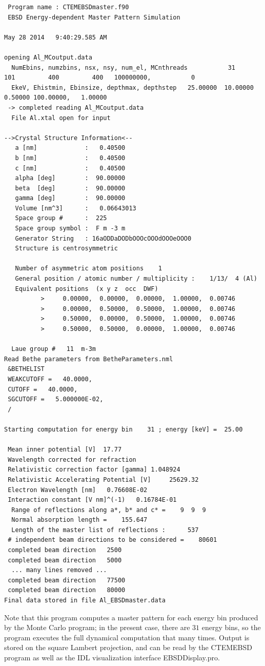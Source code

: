 \documentclass[DIV=calc, paper=letter, fontsize=11pt]{scrartcl}	 %
\begin{document}
\begin{verbatim}
 Program name : CTEMEBSDmaster.f90
 EBSD Energy-dependent Master Pattern Simulation

May 28 2014   9:40:29.585 AM

opening Al_MCoutput.data
  NumEbins, numzbins, nsx, nsy, num_el, MCnthreads           31         101         400         400   100000000,           0
  EkeV, Ehistmin, Ebinsize, depthmax, depthstep   25.00000  10.00000   0.50000 100.00000,   1.00000
 -> completed reading Al_MCoutput.data
  File Al.xtal open for input

-->Crystal Structure Information<--
   a [nm]             :   0.40500
   b [nm]             :   0.40500
   c [nm]             :   0.40500
   alpha [deg]        :  90.00000
   beta  [deg]        :  90.00000
   gamma [deg]        :  90.00000
   Volume [nm^3]      :   0.06643013
   Space group #      :  225
   Space group symbol :  F m -3 m
   Generator String   : 16aODDaDODbOOOcOOOdOOOeOOO0
   Structure is centrosymmetric

   Number of asymmetric atom positions    1
   General position / atomic number / multiplicity :    1/13/  4 (Al)
   Equivalent positions  (x y z  occ  DWF)
          >     0.00000,  0.00000,  0.00000,  1.00000,  0.00746
          >     0.00000,  0.50000,  0.50000,  1.00000,  0.00746
          >     0.50000,  0.00000,  0.50000,  1.00000,  0.00746
          >     0.50000,  0.50000,  0.00000,  1.00000,  0.00746

  Laue group #   11  m-3m
Read Bethe parameters from BetheParameters.nml
 &BETHELIST
 WEAKCUTOFF =   40.0000,
 CUTOFF =   40.0000,
 SGCUTOFF =   5.000000E-02,
 /

Starting computation for energy bin    31 ; energy [keV] =  25.00

 Mean inner potential [V]  17.77
 Wavelength corrected for refraction
 Relativistic correction factor [gamma] 1.048924
 Relativistic Accelerating Potential [V]     25629.32
 Electron Wavelength [nm]   0.76608E-02
 Interaction constant [V nm]^(-1)   0.16784E-01
  Range of reflections along a*, b* and c* =    9  9  9
  Normal absorption length =    155.647
  Length of the master list of reflections :      537
 # independent beam directions to be considered =    80601
 completed beam direction   2500
 completed beam direction   5000
  ... many lines removed ...
 completed beam direction   77500
 completed beam direction   80000
Final data stored in file Al_EBSDmaster.data
\end{verbatim}
Note that this program computes a master pattern for each energy bin produced by the Monte Carlo program; in the
present case, there are $31$ energy bins, so the program executes the full dynamical computation that many times.
Output is stored on the square Lambert projection, and can be read by the \textsf{CTEMEBSD} program as well
as the IDL visualization interface \textsf{EBSDDisplay.pro}.
\end{document}
